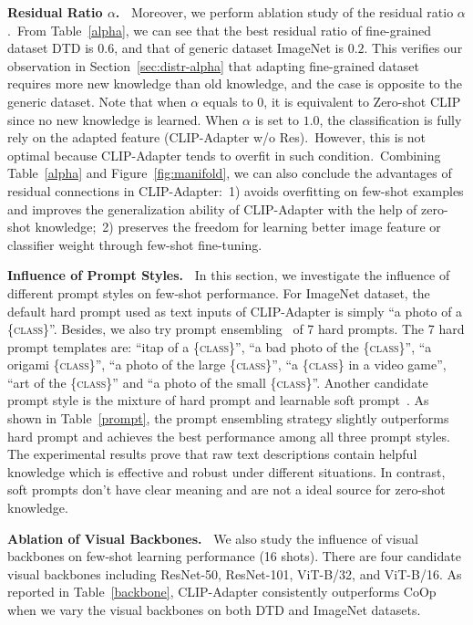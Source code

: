 \documentclass[default,iicol]{sn-jnl}%
\theoremstyle{thmstyleone}%
\theoremstyle{thmstyletwo}%
\theoremstyle{thmstylethree}%
\begin{document}
\vspace{3pt}
\noindent\textbf{Residual Ratio $\alpha$.~} Moreover, we perform ablation study of the residual ratio $\alpha$.~From Table~\ref{alpha}, we can see that the best residual ratio of fine-grained dataset DTD is $0.6$, and that of generic dataset ImageNet is $0.2$. This verifies our observation in Section~\ref{sec:distr-alpha} that adapting fine-grained dataset requires more new knowledge than old knowledge, and the case is opposite to the generic dataset. Note that when $\alpha$ equals to $0$, it is equivalent to Zero-shot CLIP since no new knowledge is learned. When $\alpha$ is set to $1.0$, the classification is fully rely on the adapted feature (CLIP-Adapter w/o Res).~However, this is not optimal because CLIP-Adapter tends to overfit in such condition.~Combining Table~\ref{alpha} and Figure~\ref{fig:manifold}, we can also conclude the advantages of residual connections in CLIP-Adapter:~1) avoids overfitting on few-shot examples and improves the generalization ability of CLIP-Adapter with the help of zero-shot knowledge;~2) preserves the freedom for learning better image feature or classifier weight through few-shot fine-tuning.


\vspace{3pt}
\noindent\textbf{Influence of Prompt Styles.~} In this section, we investigate the influence of different prompt styles on few-shot performance. For ImageNet dataset, the default hard prompt used as text inputs of CLIP-Adapter is simply ``a photo of a \{\textsc{class}\}''. Besides, we also try prompt ensembling~\cite{zhou2021coop} of 7 hard prompts. The 7 hard prompt templates are: ``itap of a \{\textsc{class}\}'', ``a bad photo of the \{\textsc{class}\}'', ``a origami \{\textsc{class}\}'', ``a photo of the large \{\textsc{class}\}'', ``a \{\textsc{class}\} in a video game'', ``art of the \{\textsc{class}\}'' and ``a photo of the small \{\textsc{class}\}''. Another candidate prompt style is the mixture of hard prompt and learnable soft prompt~\cite{zhou2021coop}. As shown in Table~\ref{prompt}, the prompt ensembling strategy slightly outperforms hard prompt and achieves the best performance among all three prompt styles. The experimental results prove that raw text descriptions contain helpful knowledge which is effective and robust under different situations. In contrast, soft prompts don't have clear meaning and are not a ideal source for zero-shot knowledge.

\vspace{3pt}
\noindent\textbf{Ablation of Visual Backbones.~} We also study the influence of visual backbones on few-shot learning performance (16 shots). There are four candidate visual backbones including ResNet-50, ResNet-101, ViT-B/32, and ViT-B/16. As reported in Table~\ref{backbone}, CLIP-Adapter consistently outperforms CoOp when we vary the visual backbones on both DTD and ImageNet datasets.
\end{document}
